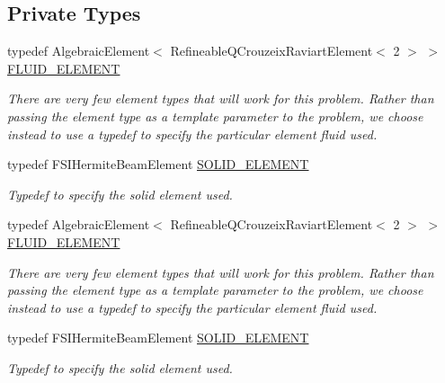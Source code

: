 \subsection*{Private Types}
\begin{DoxyCompactItemize}
\item 
typedef Algebraic\+Element$<$ Refineable\+Q\+Crouzeix\+Raviart\+Element$<$ 2 $>$ $>$ \hyperlink{classFSIRingProblem_a2ce9ba3122272853bfa6ec3fcf39b78a}{F\+L\+U\+I\+D\+\_\+\+E\+L\+E\+M\+E\+NT}
\begin{DoxyCompactList}\small\item\em There are very few element types that will work for this problem. Rather than passing the element type as a template parameter to the problem, we choose instead to use a typedef to specify the particular element fluid used. \end{DoxyCompactList}\item 
typedef F\+S\+I\+Hermite\+Beam\+Element \hyperlink{classFSIRingProblem_a96528378f3baf6100aeb6b4fe83bc870}{S\+O\+L\+I\+D\+\_\+\+E\+L\+E\+M\+E\+NT}
\begin{DoxyCompactList}\small\item\em Typedef to specify the solid element used. \end{DoxyCompactList}\item 
typedef Algebraic\+Element$<$ Refineable\+Q\+Crouzeix\+Raviart\+Element$<$ 2 $>$ $>$ \hyperlink{classFSIRingProblem_a2ce9ba3122272853bfa6ec3fcf39b78a}{F\+L\+U\+I\+D\+\_\+\+E\+L\+E\+M\+E\+NT}
\begin{DoxyCompactList}\small\item\em There are very few element types that will work for this problem. Rather than passing the element type as a template parameter to the problem, we choose instead to use a typedef to specify the particular element fluid used. \end{DoxyCompactList}\item 
typedef F\+S\+I\+Hermite\+Beam\+Element \hyperlink{classFSIRingProblem_a96528378f3baf6100aeb6b4fe83bc870}{S\+O\+L\+I\+D\+\_\+\+E\+L\+E\+M\+E\+NT}
\begin{DoxyCompactList}\small\item\em Typedef to specify the solid element used. \end{DoxyCompactList}\end{DoxyCompactItemize}
